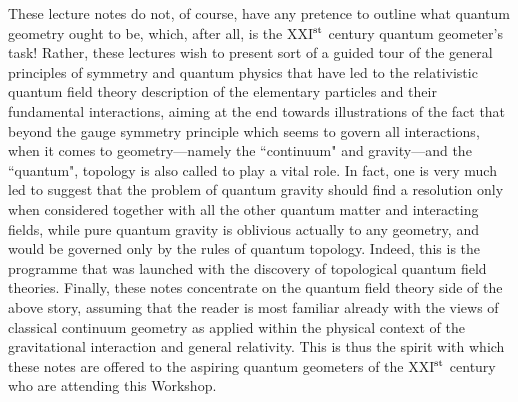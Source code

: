 \documentclass[a4paper,11pt]{article}
\begin{document}
These lecture notes do not, of course, have any pretence to outline what
quantum geometry ought to be, which, after all, is the XXI$^{\rm st}$ century 
quantum geometer's task! Rather, these lectures wish to present sort of a 
guided tour of the general principles of symmetry and quantum physics that 
have led to the relativistic quantum field theory description of the
elementary particles and their fundamental interactions, aiming at the
end towards illustrations of the fact that beyond the gauge symmetry
principle which seems to go\-vern all interactions, when it comes to
geometry---namely the ``continuum" and gravity---and the ``quantum",
topology is also called to play a vital role. In fact, one is very much
led to suggest that the problem of quantum gra\-vi\-ty should find a 
resolution only when considered together with all the other quantum
matter and interacting fields, while pure quantum gravity
is obli\-vious actually to any geometry, and would be governed only by the
rules of quantum topology. Indeed, this is the programme that was 
launched\cite{Wit1,Wit2} with the dis\-co\-ve\-ry of topological quantum 
field theories.\cite{Wit1,Wit2,TQFT}
Finally, these notes concentrate on the quantum field theory side of
the above story, assuming that the reader is most familiar already with
the views of classical continuum geometry as applied within the physical
context of the gravitational interaction and general relativity.
This is thus the spirit with which these notes are offered to the aspiring 
quantum geometers of the XXI$^{\rm st}$ century who are attending this 
Workshop.
\end{document}
